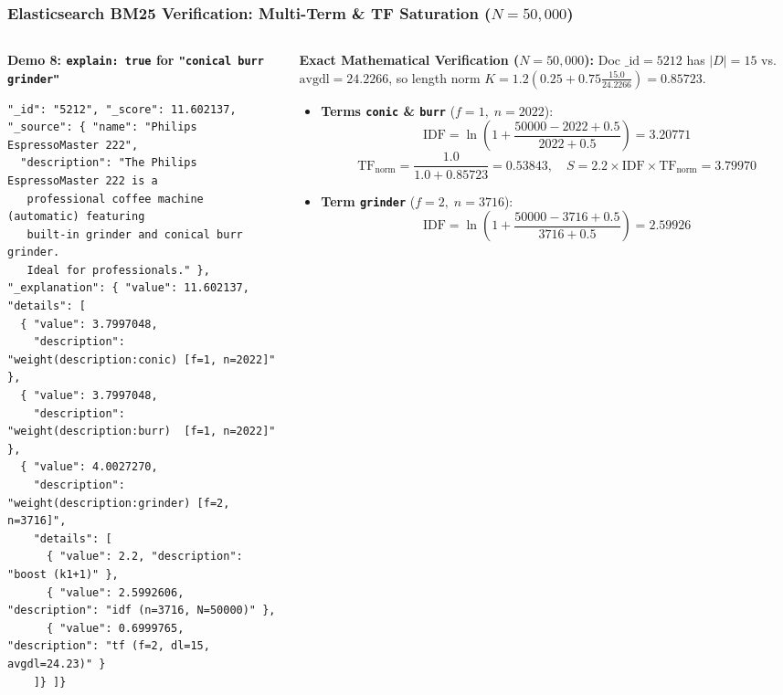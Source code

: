 \documentclass[aspectratio=169]{beamer}
\begin{document}
\begin{frame}[fragile]
\frametitle{Elasticsearch BM25 Verification: Multi-Term \& TF Saturation ($N=50,000$)}
\begin{columns}[T]
\begin{column}{0.50\textwidth}
\textbf{\tiny Demo 8: \texttt{explain: true} for \texttt{"conical burr grinder"}}
\begin{lstlisting}
"_id": "5212", "_score": 11.602137,
"_source": { "name": "Philips EspressoMaster 222",
  "description": "The Philips EspressoMaster 222 is a
   professional coffee machine (automatic) featuring
   built-in grinder and conical burr grinder.
   Ideal for professionals." },
"_explanation": { "value": 11.602137, "details": [
  { "value": 3.7997048,
    "description": "weight(description:conic) [f=1, n=2022]" },
  { "value": 3.7997048,
    "description": "weight(description:burr)  [f=1, n=2022]" },
  { "value": 4.0027270,
    "description": "weight(description:grinder) [f=2, n=3716]",
    "details": [
      { "value": 2.2, "description": "boost (k1+1)" },
      { "value": 2.5992606, "description": "idf (n=3716, N=50000)" },
      { "value": 0.6999765, "description": "tf (f=2, dl=15, avgdl=24.23)" }
    ]} ]}
\end{lstlisting}
\end{column}
\begin{column}{0.47\textwidth}
\textbf{\tiny Exact Mathematical Verification ($N = 50,000$):}
\tiny
Doc $\text{\_id}=5212$ has $|D|=15$ vs. $\text{avgdl}=24.2266$, so length norm $K = 1.2\left(0.25 + 0.75\frac{15.0}{24.2266}\right) = \mathbf{0.85723}$.
\begin{itemize}
    \item \textbf{Terms \texttt{conic} \& \texttt{burr}} ($f=1,\; n=2022$):
    \vspace{-0.12cm}
    \[
    \text{IDF} = \ln\!\left(1 + \frac{50000 - 2022 + 0.5}{2022 + 0.5}\right) = 3.20771
    \]
    \vspace{-0.22cm}
    \[
    \text{TF}_{\text{norm}} = \frac{1.0}{1.0 + 0.85723} = 0.53843, \quad S = 2.2 \times \text{IDF} \times \text{TF}_{\text{norm}} = \mathbf{3.79970}
    \]
    \item \textbf{Term \texttt{grinder}} ($f=2,\; n=3716$):
    \vspace{-0.12cm}
    \[
    \text{IDF} = \ln\!\left(1 + \frac{50000 - 3716 + 0.5}{3716 + 0.5}\right) = 2.59926
\]
\end{itemize}
\end{column}
\end{columns}
\end{frame}
\end{document}

